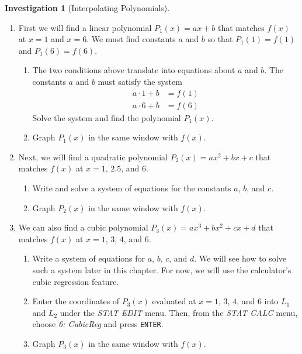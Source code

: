 \documentclass[10pt,]{book}
\theoremstyle{plain}
\theoremstyle{definition}
\theoremstyle{definition}
\theoremstyle{definition}
\newtheorem{investigation}[project]{Investigation}
\theoremstyle{definition}
\numberwithin{equation}{section}
\newcommand{\amp}{ & }
\begin{document}
\begin{investigation}[Interpolating Polynomials]
\begin{enumerate}[label=*\arabic**]
\begin{enumerate}[label=*\alph**]
\end{enumerate}
\item\hypertarget{li-4}{}
			First we will find a linear polynomial \(P_1(x) = ax + b\) that matches \(f(x)\) at \(x = 1\) and \(x=6\). We must find constants \(a\) and \(b\) so that \(P_1(1) = f(1)\) and \(P_1(6) = f(6)\).
			\begin{enumerate}[label=*\alph**]
\item\hypertarget{li-5}{}
					The two conditions above translate into equations about \(a\) and \(b\). The constants \(a\) and \(b\) must satisfy the system
					\begin{align*}
a \cdot 1 + b \amp = f (1)\\
a \cdot 6 + b \amp = f (6)
\end{align*}
					Solve the system and find the polynomial \(P_1(x)\).
\item\hypertarget{li-6}{}
					Graph \(P_1(x)\) in the same window with \(f(x)\).
\end{enumerate}
\item\hypertarget{li-7}{}
			Next, we will find a quadratic polynomial \(P_2(x) = ax^2 + bx + c\) that matches \(f(x)\) at \(x = 1\), \(2.5\), and \(6\).
			\begin{enumerate}[label=*\alph**]
\item\hypertarget{li-8}{}
					Write and solve a system of equations for the constants \(a\), \(b\), and \(c\).
\item\hypertarget{li-9}{}
					Graph \(P_2(x)\) in the same window with \(f(x)\).
\end{enumerate}

\item\hypertarget{li-10}{}
			We can also find a cubic polynomial \(P_3(x) = ax^3 + bx^2 + cx + d\) that matches \(f(x)\) at \(x = 1\), \(3\), \(4\), and \(6\).
			\begin{enumerate}[label=*\alph**]
\item\hypertarget{li-11}{}
					Write a system of equations for \(a\), \(b\), \(c\), and \(d\). We will see how to solve such a system later in this chapter. For now, we will use the calculator's cubic regression feature.
\item\hypertarget{li-12}{}
					Enter the coordinates of \(P_3(x)\) evaluated at \(x=1\), \(3\), \(4\), and \(6\) into \(L_1\) and \(L_2\) under the \emph{STAT EDIT} menu. Then, from the \emph{STAT CALC} menu, choose \emph{6: CubicReg} and press \lstinline?ENTER?.
\item\hypertarget{li-13}{}
					Graph \(P_3(x)\) in the same window with \(f(x)\).
\end{enumerate}


\end{enumerate}
\end{investigation}
\end{document}
